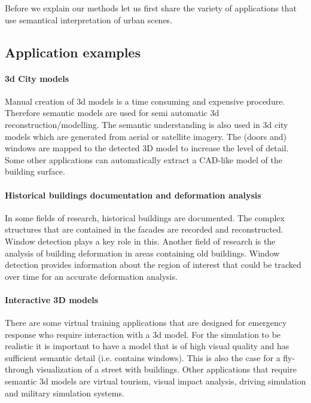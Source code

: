 Before we explain our methods let us first share the variety of applications 
that use semantical interpretation of urban scenes.  \\

\subsection{Application examples}
\paragraph{3d City models} 
	Manual creation of 3d models is a time consuming and expensive procedure.
	Therefore semantic models are used for semi automatic 3d
	reconstruction/modelling.
	The semantic understanding is also used in 3d city models which are
	generated from aerial or satellite imagery.  The (doors and) windows are mapped to the detected 3D model to increase the level of detail. 
	Some other applications can automatically extract a CAD-like model of
	the building surface.

\paragraph{Historical buildings documentation and deformation analysis}
	In some fields of research, historical buildings are documented. The complex
	structures that are contained in the facades are recorded and reconstructed.
	Window detection plays a key role in this. 
	Another field of research is the analysis of building deformation in areas
	containing old buildings.  Window detection provides information about the
	region of interest that could be tracked over time for an accurate
	deformation analysis.

\paragraph{Interactive 3D models}
	There are some virtual training applications that are designed for
	emergency response who require interaction with a 3d model.  
	For the simulation to be realistic it is important to have a model that is
	of high visual quality and has sufficient semantic detail (i.e. contains
	windows).  This is also the case for a fly-through visualization of a street with
	buildings.
	Other applications that require semantic 3d models are virtual tourism,
	visual impact analysis, driving simulation and military simulation systems.

